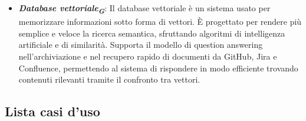 \begin{itemize}
    \item \textbf{\emph{Database vettoriale}\textsubscript{\textbf{\textit{G}}}}: Il database vettoriale è un sistema usato per memorizzare informazioni sotto forma di vettori. È progettato per rendere più semplice e veloce la ricerca semantica, sfruttando algoritmi di intelligenza artificiale e di similarità. Supporta il modello di question answering nell'archiviazione e nel recupero rapido di documenti da GitHub, Jira e Confluence, permettendo al sistema di rispondere in modo efficiente trovando contenuti rilevanti tramite il confronto tra vettori.

\end{itemize}


\subsection{Lista casi d'uso}





